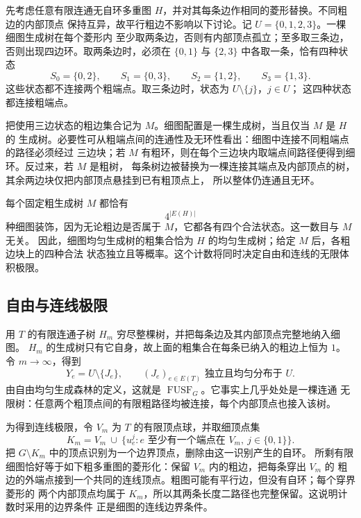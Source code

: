 \documentclass[UTF8,zihao=-4,a4paper]{ctexart}
\numberwithin{equation}{section}
\begin{document}
先考虑任意有限连通无自环多重图 $H$，并对其每条边作相同的菱形替换。不同粗边的内部顶点
保持互异，故平行粗边不影响以下讨论。记 $U=\{0,1,2,3\}$。一棵细图生成树在每个菱形内
至少取两条边，否则有内部顶点孤立；至多取三条边，否则出现四边环。取两条边时，必须在
$\{0,1\}$ 与 $\{2,3\}$ 中各取一条，恰有四种状态
\begin{equation}\label{b2:states}
 S_0=\{0,2\},\qquad S_1=\{0,3\},\qquad
 S_2=\{1,2\},\qquad S_3=\{1,3\}.
\end{equation}
这些状态都不连接两个粗端点。取三条边时，状态为 $U\setminus\{j\}$，$j\in U$；
这四种状态都连接粗端点。

把使用三边状态的粗边集合记为 $M$。细图配置是一棵生成树，当且仅当 $M$ 是 $H$ 的
生成树。必要性可从粗端点间的连通性及无环性看出：细图中连接不同粗端点的路径必须经过
三边块；若 $M$ 有粗环，则在每个三边块内取端点间路径便得到细环。反过来，若 $M$ 是粗树，
每条树边被替换为一棵连接其端点及内部顶点的树，其余两边块仅把内部顶点悬挂到已有粗顶点上，
所以整体仍连通且无环。

每个固定粗生成树 $M$ 都恰有
\begin{equation}\label{b2:count}
 4^{|E(H)|}
\end{equation}
种细图装饰，因为无论粗边是否属于 $M$，它都各有四个合法状态。这一数目与 $M$ 无关。
因此，细图均匀生成树的粗集合恰为 $H$ 的均匀生成树；给定 $M$ 后，各粗边块上的四种合法
状态独立且等概率。这个计数将同时决定自由和连线的无限体积极限。

\subsection{自由与连线极限}\label{b2:limits}

用 $T$ 的有限连通子树 $H_m$ 穷尽整棵树，并把每条边及其内部顶点完整地纳入细图。
$H_m$ 的生成树只有它自身，故上面的粗集合在每条已纳入的粗边上恒为 $1$。
令 $m\to\infty$，得到
\begin{equation}\label{b2:fusf}
 Y_e=U\setminus\{J_e\},\qquad
 (J_e)_{e\in E(T)}\text{ 独立且均匀分布于 }U.
\end{equation}
由自由均匀生成森林的定义，这就是 $\operatorname{FUSF}_G$。它事实上几乎处处是一棵连通
无限树：任意两个粗顶点间的有限粗路径均被连接，每个内部顶点也接入该树。

为得到连线极限，令 $V_m$ 为 $T$ 的有限顶点球，并取细顶点集
\[
 K_m=V_m\ \cup\ \{u_e^j:e\text{ 至少有一个端点在 }V_m,\ j\in\{0,1\}\}.
\]
把 $G\setminus K_m$ 中的顶点识别为一个边界顶点，删除由这一识别产生的自环。
所剩有限细图恰好等于如下粗多重图的菱形化：保留 $V_m$ 内的粗边，把每条穿出 $V_m$ 的
粗边的外端点接到一个共同的连线顶点。粗图可能有平行边，但没有自环；每个穿界菱形的
两个内部顶点均属于 $K_m$，所以其两条长度二路径也完整保留。这说明计数时采用的边界条件
正是细图的连线边界条件。
\end{document}
